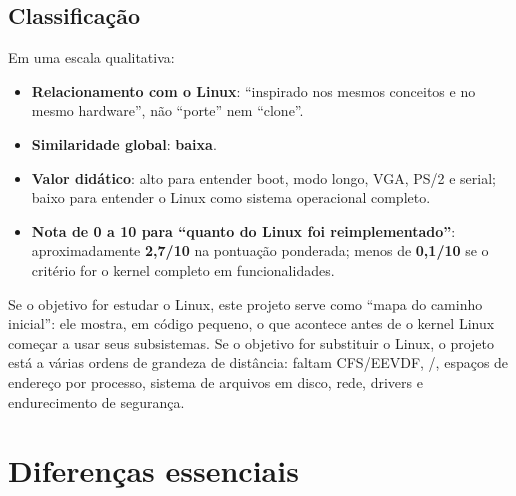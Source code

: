 \subsection{Classifica\c{c}\~ao}

Em uma escala qualitativa:

\begin{itemize}
  \item \textbf{Relacionamento com o Linux}: ``inspirado nos mesmos
        conceitos e no mesmo hardware'', n\~ao ``porte'' nem ``clone''.
  \item \textbf{Similaridade global}: \textbf{baixa}.
  \item \textbf{Valor did\'atico}: alto para entender boot, modo longo,
        VGA, PS/2 e serial; baixo para entender o Linux como sistema
        operacional completo.
  \item \textbf{Nota de 0 a 10 para ``quanto do Linux foi reimplementado''}:
        aproximadamente \textbf{2,7/10} na pontua\c{c}\~ao ponderada; menos de
        \textbf{0,1/10} se o crit\'erio for o kernel completo em
        funcionalidades.
\end{itemize}

\begin{nota}
Se o objetivo for estudar o Linux, este projeto serve como ``mapa do
caminho inicial'': ele mostra, em c\'odigo pequeno, o que acontece antes de
o kernel Linux come\c{c}ar a usar seus subsistemas. Se o objetivo for
substituir o Linux, o projeto est\'a a v\'arias ordens de grandeza de
dist\^ancia: faltam CFS/EEVDF, /, espa\c{c}os de
endere\c{c}o por processo, sistema de arquivos em disco, rede, drivers e
endurecimento de seguran\c{c}a.
\end{nota}

\section{Diferen\c{c}as essenciais}

